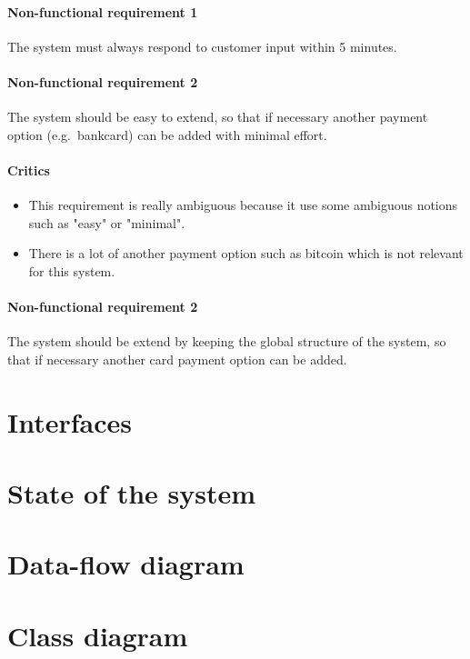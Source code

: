 \documentclass[11pt, a4paper]{article}
\begin{document}
\begin{framed}
\end{framed}

\paragraph{Non-functional requirement 1} The system must always respond to
customer input within 5 minutes.

\paragraph{Non-functional requirement 2} The system should be easy to
extend, so that if necessary another payment option (e.g.\ bankcard) can be
added with minimal effort.

\begin{framed}
    \paragraph{Critics} 
    \begin{itemize}
        \item This requirement is really ambiguous because it use some
            ambiguous notions such as "easy" or "minimal".

        \item There is a lot of another payment option such as bitcoin
            which is not relevant for this system.
    \end{itemize}
\paragraph{Non-functional requirement 2} The system should be extend by
keeping the global structure of the system, so that if necessary another
card payment option can be added.
\end{framed}

\section{Interfaces}
\section{State of the system}
\section{Data-flow diagram}
\section{Class diagram}
\end{document}
